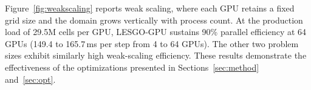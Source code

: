 Figure~\ref{fig:weakscaling} reports weak scaling, where each GPU retains
a fixed grid size and the domain grows vertically with process count.
At the production load of 29.5M cells per GPU, LESGO-GPU sustains 90\%
parallel efficiency at 64 GPUs (149.4 to 165.7\,ms per step from 4 to
64 GPUs). The other two problem sizes exhibit similarly high weak-scaling efficiency. 
These results demonstrate the effectiveness
of the optimizations presented in Sections~\ref{sec:method} and~\ref{sec:opt}.




